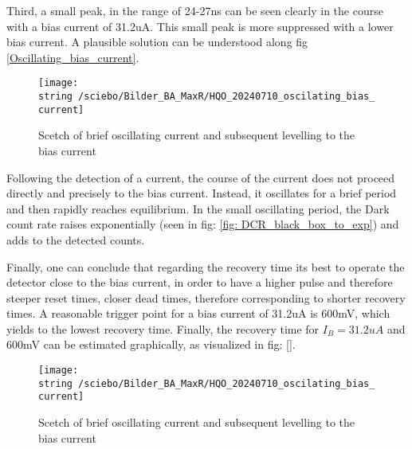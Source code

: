 Third, a small peak, in the range of 24-27ns can be seen clearly in the course with a bias current of 31.2uA.
This small peak is more suppressed with a lower bias current.
A plausible solution can be understood along fig \ref{Oscillating_bias_current}.

\begin{figure}[H]
 \centering
 \texttt{[image: \\string~/sciebo/Bilder\_BA\_MaxR/HQO\_20240710\_oscilating\_bias\_current]}
 \caption{Scetch of brief oscillating current and subsequent levelling to the bias current}
 \label{fig: Oscillating_bias_current}
\end{figure}


Following the detection of a current, the course of the current does not proceed directly and precisely to the bias current.
Instead, it oscillates for a brief period and then rapidly reaches equilibrium.
In the small oscillating period, the Dark count rate raises exponentially (seen in fig: \ref{fig: DCR_black_box_to_exp})
and adds to the detected counts.

Finally, one can conclude that regarding the recovery time its best to operate the detector close to the bias current,
in order to have a higher pulse and therefore steeper reset times, closer dead times, therefore
corresponding to shorter recovery times.
A reasonable trigger point for a bias current of 31.2uA is 600mV, which yields to the lowest recovery time.
Finally, the recovery time for $I_{B} = 31.2uA$ and 600mV can be estimated graphically, as visualized
in fig: \ref{}.

\begin{figure}[H]
 \centering
 \texttt{[image: \\string~/sciebo/Bilder\_BA\_MaxR/HQO\_20240710\_oscilating\_bias\_current]}
 \caption{Scetch of brief oscillating current and subsequent levelling to the bias current}
 \label{fig: Oscillating_bias_current}
\end{figure}


